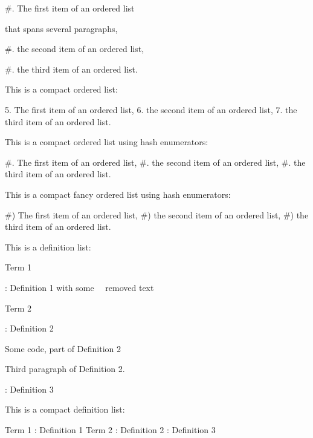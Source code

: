 #. The first item of an ordered list

   that spans several paragraphs,

#. the second item of an ordered list,

#. the third item of an ordered list.

This is a compact ordered list:

5. The first item of an ordered list,
6. the second item of an ordered list,
7. the third item of an ordered list.

This is a compact ordered list using hash enumerators:

#. The first item of an ordered list,
#. the second item of an ordered list,
#. the third item of an ordered list.

This is a compact fancy ordered list using hash enumerators:

#) The first item of an ordered list,
#) the second item of an ordered list,
#) the third item of an ordered list.

This is a definition list:

Term 1

:   Definition 1 with some ~~removed text~~

Term 2

:   Definition 2

        Some code, part of Definition 2

    Third paragraph of Definition 2.

:   Definition 3

This is a compact definition list:

Term 1
:   Definition 1
Term 2
:   Definition 2
:   Definition 3

\markdownEnd

\bye
